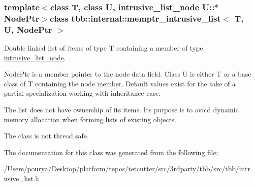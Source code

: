 \subsubsection*{template$<$class T, class U, intrusive\+\_\+list\+\_\+node U\+::$\ast$ Node\+Ptr$>$class tbb\+::internal\+::memptr\+\_\+intrusive\+\_\+list$<$ T, U, Node\+Ptr $>$}

Double linked list of items of type T containing a member of type \hyperlink{structtbb_1_1internal_1_1intrusive__list__node}{intrusive\+\_\+list\+\_\+node}. 

Node\+Ptr is a member pointer to the node data field. Class U is either T or a base class of T containing the node member. Default values exist for the sake of a partial specialization working with inheritance case.

The list does not have ownership of its items. Its purpose is to avoid dynamic memory allocation when forming lists of existing objects.

The class is not thread safe. 

The documentation for this class was generated from the following file\+:\begin{DoxyCompactItemize}
\item 
/\+Users/pourya/\+Desktop/platform/repos/tetcutter/src/3rdparty/tbb/src/tbb/intrusive\+\_\+list.\+h\end{DoxyCompactItemize}

